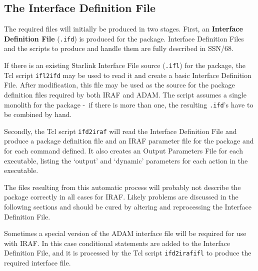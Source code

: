 \documentclass[twoside,11pt]{article}
\newcommand{\xref}[3]{#1}
\newcommand{\xlabel}[1]{}
\newcommand{\dash}{--}
\renewcommand{\dash}{-}
\begin{document}
\subsection{\xlabel{the_interface_definition_file}The Interface Definition File}
The required files will initially be produced in two stages. First, an
{\bfseries Interface Definition File} (\texttt{.ifd}) is produced for the
package.
Interface Definition Files and the scripts to produce and handle them are fully
described in
\xref{SSN/68}{ssn68}{}.

If there is an existing Starlink Interface File source (\texttt{.ifl}) for
the package, the Tcl script
\xref{\texttt{ifl2ifd}}{ssn68}{creating_ifds_from_interface_files}
may be used to read it and create a basic
Interface Definition File.
After modification, this file may be used as the source for the package
definition files required by both IRAF and ADAM.
The script assumes a single monolith for the package \dash\ if there is more
than one, the resulting \texttt{.ifd}'s have to be combined by hand.

Secondly, the Tcl script
\xref{\texttt{ifd2iraf}}{ssn68}{producing_iraf_files_from_an_ifd}
will read the Interface Definition File
and produce a package definition file and an IRAF parameter file for
the package and for each command defined. It also creates an Output Parameters
File for each executable, listing the `output' and
`dynamic' parameters for each action in the executable.

The files resulting from this automatic process will probably not describe
the package correctly in all cases for IRAF.
Likely problems are discussed in the following sections and should be cured by
altering and reprocessing the Interface Definition File.

Sometimes a special version of the ADAM interface file will be required for
use with IRAF. In this case conditional statements are added to the
Interface Definition File, and it is processed by the Tcl script
\xref{\texttt{ifd2irafifl}}{ssn68}{ifd2irafifl} to produce the required
interface file.
\end{document}
